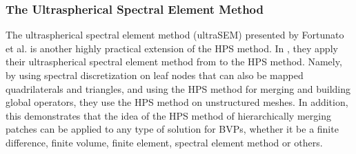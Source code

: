 \subsubsection{The Ultraspherical Spectral Element Method}

The ultraspherical spectral element method (ultraSEM) presented by Fortunato et al. is another highly practical extension of the HPS method. In \citep{fortunato2020ultraspherical}, they apply their ultraspherical spectral element method from \citep{olver2013fast} to the HPS method. Namely, by using spectral discretization on leaf nodes that can also be mapped quadrilaterals and triangles, and using the HPS method for merging and building global operators, they use the HPS method on unstructured meshes. In addition, this demonstrates that the idea of the HPS method of hierarchically merging patches can be applied to any type of solution for BVPs, whether it be a finite difference, finite volume, finite element, spectral element method or others.
